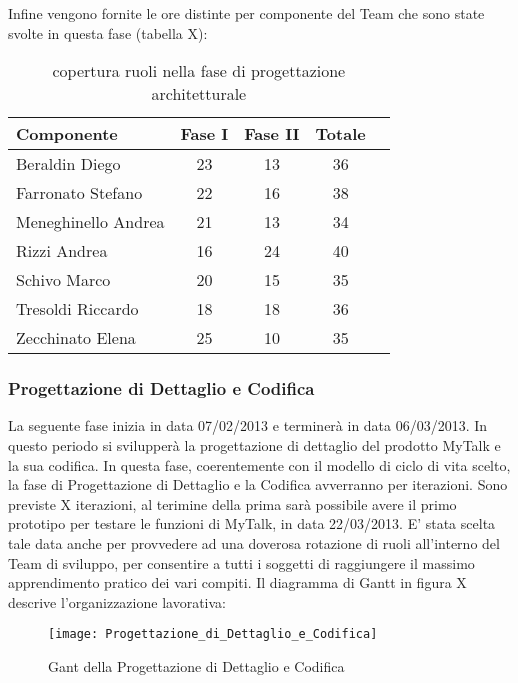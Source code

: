 Infine vengono fornite le ore distinte per componente del Team che sono state svolte in questa fase (tabella X):\\
\begin{table}[h]
\centering
\begin{tabular}{|l|c|c|cl|}
\hline
Componente& Fase I& Fase II& Totale& \\
\hline
Beraldin Diego &23 &13 & 36&\\
Farronato Stefano & 22& 16& 38&\\
Meneghinello Andrea & 21& 13& 34&\\
Rizzi Andrea & 16& 24& 40&\\
Schivo Marco & 20& 15& 35&\\
Tresoldi Riccardo & 18& 18& 36&\\
Zecchinato Elena & 25& 10& 35&\\
\hline
\end{tabular}
\caption{copertura ruoli nella fase di progettazione architetturale}
\end{table}


\subsubsection{Progettazione di Dettaglio e Codifica}
La seguente fase inizia in data 07/02/2013 e terminerà in data 06/03/2013. In questo periodo si svilupperà la progettazione di dettaglio del prodotto MyTalk e la sua codifica.
In questa fase, coerentemente con il modello di ciclo di vita scelto, la fase di Progettazione di Dettaglio e la Codifica avverranno per iterazioni.
Sono previste X iterazioni, al terimine della prima sarà possibile avere il primo prototipo per testare le funzioni di MyTalk, in data 22/03/2013.
E' stata scelta tale data anche per provvedere ad una doverosa rotazione di ruoli all'interno del Team di sviluppo, per consentire a tutti i soggetti di raggiungere il massimo apprendimento pratico dei vari compiti.
Il diagramma di Gantt in figura X descrive l'organizzazione lavorativa:\\

\begin{figure}[h]
  \texttt{[image: Progettazione\_di\_Dettaglio\_e\_Codifica]}
\caption{Gant della Progettazione di Dettaglio e Codifica}
\end{figure}



